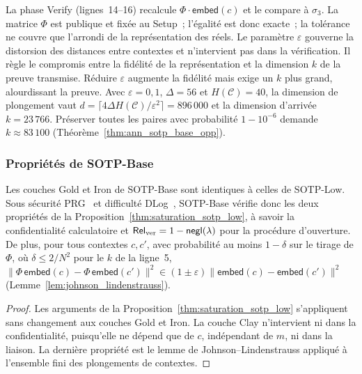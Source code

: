 \begin{sloppypar}
La phase \textsf{Verify} (lignes~14--16) recalcule $\Phi \cdot \mathsf{embed}(c)$ et le compare
\`a $\sigma_3$. La matrice $\Phi$ est publique et fix\'ee au \textsf{Setup}~; l'\'egalit\'e
est donc exacte~; la tol\'erance ne couvre que l'arrondi de la repr\'esentation des r\'eels.
Le param\`etre $\varepsilon$ gouverne la distorsion des distances entre contextes et n'intervient pas
dans la v\'erification. Il r\`egle le compromis entre la fid\'elit\'e de la repr\'esentation
et la dimension $k$ de la preuve transmise. R\'eduire $\varepsilon$
augmente la fid\'elit\'e mais exige un $k$ plus grand, alourdissant
la preuve. Avec $\varepsilon = 0{,}1$, $\Delta = 56$ et $H(\mathcal{C}) = 40$, la
dimension de plongement vaut $d = \lceil 4\Delta H(\mathcal{C})/\varepsilon^2 \rceil
= 896\,000$ et la dimension d'arriv\'ee $k = 23\,766$. Pr\'eserver toutes les paires avec
probabilit\'e $1 - 10^{-6}$ demande $k \approx 83\,100$ (Th\'eor\`eme~\ref{thm:ann_sotp_base_opp}).

\subsubsection{Propri\'et\'es de SOTP-Base}
\label{subsubsec:saturation_base}

\begin{proposition}\label{thm:saturation_sotp_base}
Les couches Gold et Iron de SOTP-Base sont identiques \`a celles de SOTP-Low.
Sous s\'ecurit\'e PRG~\cite{BlumMicali84} et difficult\'e DLog~\cite{DiffieHellman76},
SOTP-Base v\'erifie donc les deux propri\'et\'es de la
Proposition~\ref{thm:saturation_sotp_low}, \`a savoir la confidentialit\'e calculatoire et
$\mathsf{Rel}_{\mathrm{ver}} = 1 - \mathsf{negl}(\lambda)$ pour la proc\'edure d'ouverture. De plus, pour
tous contextes $c, c'$, avec probabilit\'e au moins $1 - \delta$ sur le tirage
de $\Phi$, o\`u $\delta \leq 2/N^2$ pour le $k$ de la ligne~5, $\|\Phi\,\mathsf{embed}(c) - \Phi\,\mathsf{embed}(c')\|^2 \in
(1 \pm \varepsilon)\|\mathsf{embed}(c) - \mathsf{embed}(c')\|^2$
(Lemme~\ref{lem:johnson_lindenstrauss}).
\end{proposition}

\begin{proof}
Les arguments de la Proposition~\ref{thm:saturation_sotp_low} s'appliquent sans
changement aux couches Gold et Iron. La couche Clay n'intervient ni dans la
confidentialit\'e, puisqu'elle ne d\'epend que de $c$, ind\'ependant de $m$, ni dans la
liaison. La derni\`ere propri\'et\'e est le lemme de Johnson--Lindenstrauss appliqu\'e
\`a l'ensemble fini des plongements de contextes.
\end{proof}


\end{sloppypar}
